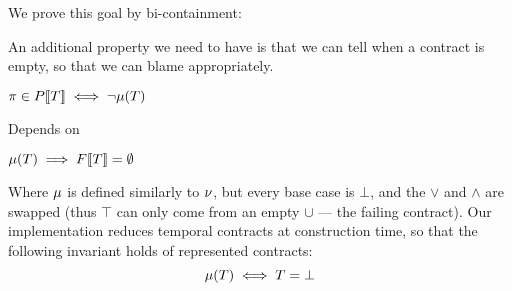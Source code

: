 \begin{byCases}
{\begin{byCases}
{\begin{pfsteps*}
        \end{pfsteps*}
        We prove this goal by bi-containment:
        \begin{byCases}
        \end{byCases}}
    \end{byCases}}
\end{byCases}

An additional property we need to have is that we can tell when a contract is empty, so that we can blame appropriately.
\begin{theorem}
  $\pi \in P[\![ T ]\!] \iff \neg\mu(T)$
\end{theorem}
%
Depends on
\begin{lemma}
  $\mu(T) \implies F[\![ T ]\!] = \emptyset$
\end{lemma}
Where $\mu$ is defined similarly to $\nu$, but every base case is $\bot$, and the $\vee$ and $\wedge$ are swapped (thus $\top$ can only come from an empty $\cup$ --- the failing contract).
%
Our implementation reduces temporal contracts at construction time, so that the following invariant holds of represented contracts:
\begin{equation*}
 \mu(T) \iff T = \bot
\end{equation*}

